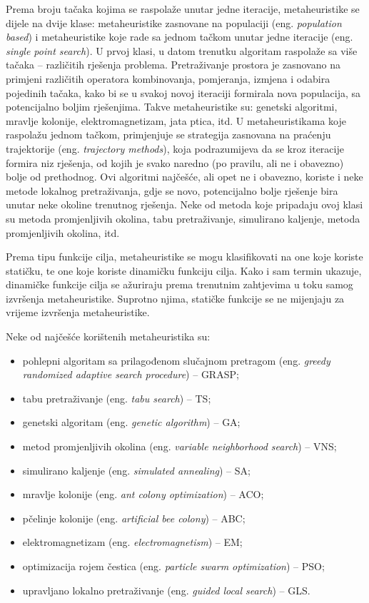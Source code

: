 \documentclass[b5paper, utf8, 11pt, colorlinks]{book}
\theoremstyle{definition}
\begin{document}
 Prema broju tačaka kojima se raspolaže unutar jedne iteracije, metaheuristike se dijele na dvije klase: metaheuristike zasnovane na populaciji (eng. \emph{population based}) i metaheuristike koje rade sa jednom tačkom unutar jedne iteracije (eng. \emph{single point search}). U prvoj klasi, u datom trenutku algoritam raspolaže sa više tačaka -- različitih rješenja problema. Pretraživanje prostora je zasnovano na primjeni različitih operatora kombinovanja, pomjeranja, izmjena i odabira pojedinih tačaka, kako bi se u svakoj novoj iteraciji formirala nova populacija, sa potencijalno boljim rješenjima. Takve metaheuristike su: genetski algoritmi, mravlje kolonije, elektromagnetizam, jata ptica, itd.
 U metaheuristikama koje raspolažu jednom tačkom, primjenjuje se strategija zasnovana na praćenju trajektorije (eng. \emph{trajectory methods}), koja podrazumijeva da se kroz iteracije formira niz rješenja, od kojih je svako naredno (po pravilu, ali ne i obavezno) bolje od prethodnog. Ovi algoritmi najčešće, ali opet ne i obavezno, koriste i neke metode lokalnog pretraživanja, gdje se novo, potencijalno bolje rješenje bira unutar neke okoline trenutnog rješenja. Neke od metoda koje pripadaju ovoj klasi su metoda promjenljivih okolina, tabu pretraživanje, simulirano kaljenje, metoda promjenljivih okolina, itd.
 
 Prema tipu funkcije cilja, metaheuristike se mogu klasifikovati na one koje koriste statičku, te one koje koriste dinamičku funkciju cilja. Kako i sam termin ukazuje, dinamičke funkcije cilja se ažuriraju prema trenutnim zahtjevima u toku samog izvršenja metaheuristike. Suprotno njima, statičke funkcije se ne mijenjaju za vrijeme izvršenja metaheuristike. 
 
 Neke od najčešće korištenih metaheuristika su:
 \begin{itemize}
 	\item pohlepni algoritam sa prilagođenom slučajnom pretragom (eng. \emph{greedy randomized adaptive search procedure}) -- GRASP;
 	\item tabu pretraživanje (eng. \emph{tabu search}) -- TS;
 	\item genetski algoritam (eng. \emph{genetic algorithm}) -- GA;
 	\item metod promjenljivih okolina (eng. \emph{variable neighborhood search}) -- VNS;
 	\item simulirano kaljenje (eng. \emph{simulated annealing}) -- SA;
 	\item mravlje kolonije (eng. \emph{ant colony optimization}) -- ACO;
 	\item pčelinje kolonije (eng. \emph{artificial  bee colony}) -- ABC;
 	\item elektromagnetizam (eng. \emph{electromagnetism}) -- EM;
 	\item optimizacija rojem čestica (eng. \emph{particle swarm optimization}) -- PSO;
 	\item upravljano lokalno pretraživanje (eng. \emph{guided local search})  -- GLS.
 \end{itemize}
 
\end{document}
